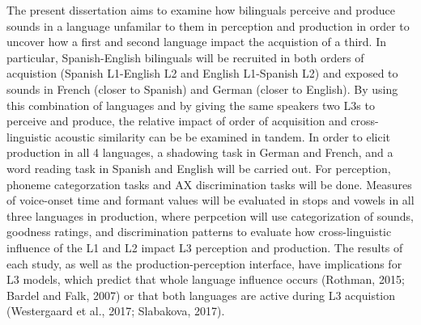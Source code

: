 The present dissertation aims to examine how bilinguals perceive and produce sounds in a language unfamilar to them in perception and production in order to uncover how a first and second language impact the acquistion of a third.
In particular, Spanish-English bilinguals will be recruited in both orders of acquistion (Spanish L1-English L2 and English L1-Spanish L2) and exposed to sounds in French (closer to Spanish) and German (closer to English).
By using this combination of languages and by giving the same speakers two L3s to perceive and produce, the relative impact of order of acquisition and cross-linguistic acoustic similarity can be be examined in tandem. 
In order to elicit production in all 4 languages, a shadowing task in German and French, and a word reading task in Spanish and English will be carried out. 
For perception, phoneme categorzation tasks and AX discrimination tasks will be done. 
Measures of voice-onset time and formant values will be evaluated in stops and vowels in all three languages in production, where perpcetion will use categorization of sounds, goodness ratings, and discrimination patterns to evaluate how cross-linguistic influence of the L1 and L2 impact L3 perception and production. 
The results of each study, as well as the production-perception interface, have implications for L3 models, which predict that whole language influence occurs (Rothman, 2015; Bardel and Falk, 2007) or that both languages are active during L3 acquistion (Westergaard et al., 2017; Slabakova, 2017).
